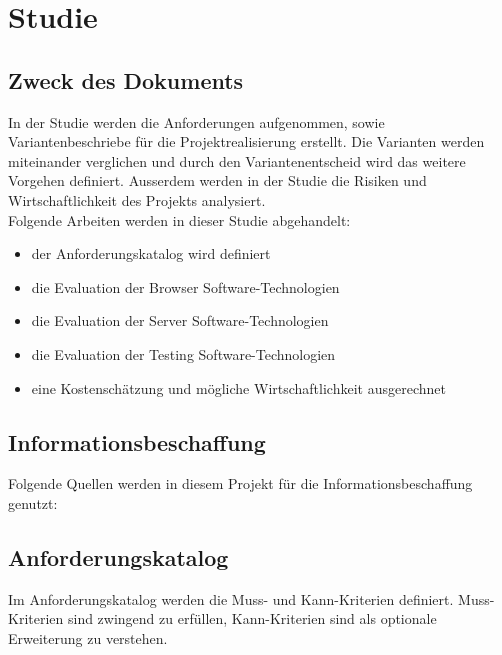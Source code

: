 \chapter{Studie}

\label{AppendixStudie}

\section{Zweck des Dokuments}\label{StudieZweck}

In der Studie werden die Anforderungen aufgenommen, sowie Variantenbeschriebe
für die Projektrealisierung erstellt. Die Varianten werden miteinander
verglichen und durch den Variantenentscheid wird das weitere
Vorgehen definiert.
Ausserdem werden in der Studie die Risiken und Wirtschaftlichkeit des Projekts
analysiert.
\\

\noindent
Folgende Arbeiten werden in dieser Studie abgehandelt:

\begin{itemize}
  \tightlist
  \item der Anforderungskatalog wird definiert
  \item die Evaluation der Browser Software-Technologien
  \item die Evaluation der Server Software-Technologien
  \item die Evaluation der Testing Software-Technologien
  \item eine Kostenschätzung und mögliche Wirtschaftlichkeit ausgerechnet
\end{itemize}


\section{Informationsbeschaffung}\label{informationsbeschaffung}

Folgende Quellen werden in diesem Projekt für die Informationsbeschaffung
genutzt:



\clearpage
\section{Anforderungskatalog}\label{anforderungskatalog}

Im Anforderungskatalog werden die Muss- und Kann-Kriterien definiert.
Muss-Kriterien sind zwingend zu erfüllen, Kann-Kriterien sind als optionale
Erweiterung zu verstehen.

